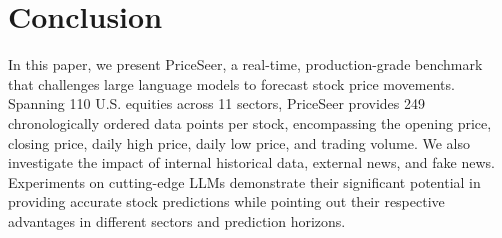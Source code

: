 \documentclass[conference]{IEEEtran}
\begin{document}
\section{Conclusion}
In this paper, we present PriceSeer, a real-time, production-grade benchmark that challenges large language models to forecast stock price movements. Spanning 110 U.S. equities across 11 sectors, PriceSeer provides 249 chronologically ordered data points per stock, encompassing the opening price, closing price, daily high price, daily low price, and trading volume. We also investigate the impact of internal historical data, external news, and fake news. Experiments on cutting-edge LLMs demonstrate their significant potential in providing accurate stock predictions while pointing out their respective advantages in different sectors and prediction horizons. 
\end{document}
